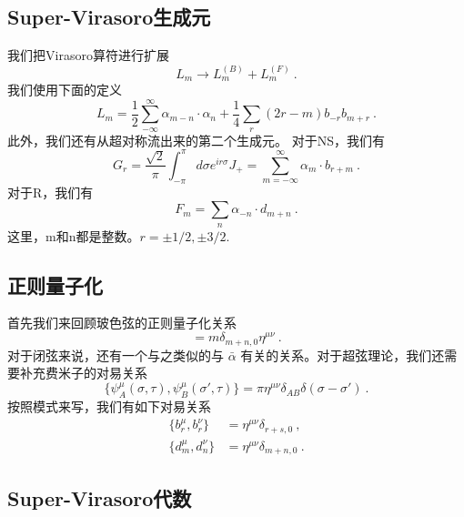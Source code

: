 \subsection{Super-Virasoro生成元}
我们把Virasoro算符进行扩展
\begin{equation}
L_m \rightarrow L_m^{(B)} + L_m^{(F)}~.
\end{equation}
我们使用下面的定义
\begin{equation}
L_m = \frac{1}{2} \sum_{-\infty}^{\infty} \alpha_{m-n} \cdot \alpha_n + \frac{1}{4} \sum_r (2r-m) b_{-r} b_{m+r}~.
\end{equation}
此外，我们还有从超对称流出来的第二个生成元。 对于NS，我们有
\begin{equation}
G_r = \frac{\sqrt{2}}{\pi} \int_{-\pi}^{\pi} d\sigma e^{ir\sigma} J_+ = \sum_{m=-\infty}^{\infty} \alpha_m \cdot b_{r+m}~.
\end{equation}
对于R，我们有
\begin{equation}
F_m = \sum_n \alpha_{-n} \cdot d_{m+n}~.
\end{equation}
这里，m和n都是整数。$r=\pm 1/2,\pm 3/2$.

\subsection{正则量子化}
首先我们来回顾玻色弦的正则量子化关系
\begin{equation}
[\alpha^\mu_m,\alpha^\nu_n] = m \delta_{m+n,0} \eta^{\mu\nu}~.
\end{equation}
对于闭弦来说，还有一个与之类似的与 $\bar\alpha$ 有关的关系。对于超弦理论，我们还需要补充费米子的对易关系
\begin{equation}
\{\psi^\mu_A(\sigma,\tau),\psi^\mu_B(\sigma',\tau) \} = \pi \eta^{\mu\nu} \delta_{AB} \delta(\sigma - \sigma')~.
\end{equation}
按照模式来写，我们有如下对易关系
\begin{equation}
\begin{aligned}
\{ b^\mu_r, b^\nu_r\} & = \eta^{\mu\nu} \delta_{r+s,0}~, \\
\{ d^\mu_m, d^\nu_n\} & = \eta^{\mu\nu} \delta_{m+n,0} ~.
\end{aligned}
\end{equation}

\subsection{Super-Virasoro代数}

